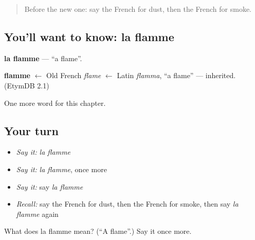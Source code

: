 \begin{quote}
Before the new one: say the French for dust, then the French for smoke.
\end{quote}

\subsection*{You'll want to know: la flamme}
\textbf{la flamme} — \textquotedblleft{}a flame\textquotedblright{}.

\begin{cousinweb}
\textbf{flamme} $\leftarrow$ Old French \emph{flame} $\leftarrow$ Latin \emph{flamma}, \textquotedblleft{}a flame\textquotedblright{} — inherited. (EtymDB 2.1)
\end{cousinweb}

\begin{grammarlens}[title={What you've built}]
One more word for this chapter.
\end{grammarlens}

\subsection*{Your turn}
\begin{itemize}
\raggedright
  \item \emph{Say it:} \emph{la flamme}
  \item \emph{Say it:} \emph{la flamme}, once more
  \item \emph{Say it:} say \emph{la flamme}
  \item \emph{Recall:} say the French for dust, then the French for smoke, then say \emph{la flamme} again
\end{itemize}

\begin{tcolorbox}[breakable,colback=teal!4,colframe=teal!35!black,title={Before you move on}]
What does la flamme mean? (\textquotedblleft{}A flame\textquotedblright{}.) Say it once more.
\end{tcolorbox}
